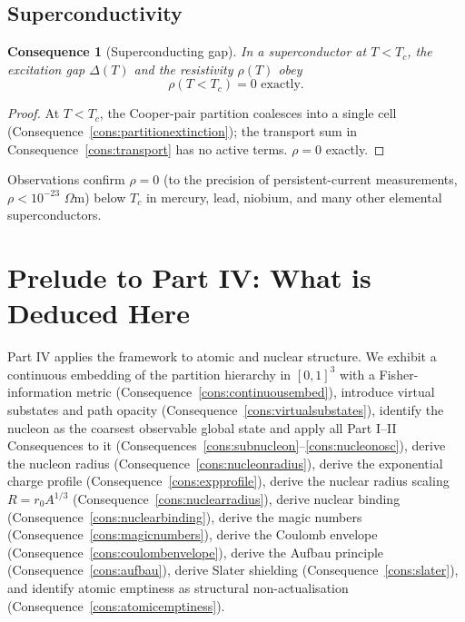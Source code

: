 \documentclass[11pt,twocolumn,a4paper]{article}
\theoremstyle{axiomstyle}
\theoremstyle{conseqstyle}
\newtheorem{consequence}{Consequence}
\theoremstyle{definition}
\theoremstyle{remark}
\begin{document}
\subsection{Superconductivity}

\begin{consequence}[Superconducting gap]
\label{cons:scgap}
In a superconductor at $T<T_{c}$, the excitation gap $\Delta(T)$ and the resistivity $\rho(T)$ obey
\begin{equation*}
\rho(T<T_{c})=0 \text{ exactly.}
\end{equation*}
\end{consequence}

\begin{proof}
At $T<T_{c}$, the Cooper-pair partition coalesces into a single cell (Consequence~\ref{cons:partitionextinction}); the transport sum in Consequence~\ref{cons:transport} has no active terms. $\rho=0$ exactly.
\end{proof}

Observations \citep{onnes1911} confirm $\rho=0$ (to the precision of persistent-current measurements, $\rho<10^{-23}$ $\Omega$m) below $T_{c}$ in mercury, lead, niobium, and many other elemental superconductors.

\section*{Prelude to Part IV: What is Deduced Here}

Part IV applies the framework to atomic and nuclear structure. We exhibit a continuous embedding of the partition hierarchy in $[0,1]^{3}$ with a Fisher-information metric (Consequence~\ref{cons:continuousembed}), introduce virtual substates and path opacity (Consequence~\ref{cons:virtualsubstates}), identify the nucleon as the coarsest observable global state and apply all Part I--II Consequences to it (Consequences~\ref{cons:subnucleon}--\ref{cons:nucleonosc}), derive the nucleon radius (Consequence~\ref{cons:nucleonradius}), derive the exponential charge profile (Consequence~\ref{cons:expprofile}), derive the nuclear radius scaling $R=r_{0}A^{1/3}$ (Consequence~\ref{cons:nuclearradius}), derive nuclear binding (Consequence~\ref{cons:nuclearbinding}), derive the magic numbers (Consequence~\ref{cons:magicnumbers}), derive the Coulomb envelope (Consequence~\ref{cons:coulombenvelope}), derive the Aufbau principle (Consequence~\ref{cons:aufbau}), derive Slater shielding (Consequence~\ref{cons:slater}), and identify atomic emptiness as structural non-actualisation (Consequence~\ref{cons:atomicemptiness}).
\end{document}
